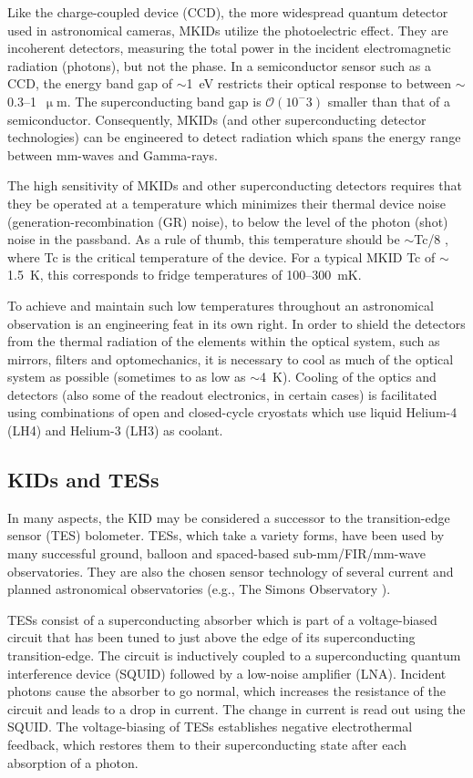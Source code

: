 Like the charge-coupled device (CCD), the more widespread quantum detector used in astronomical cameras, MKIDs utilize the photoelectric effect. They are incoherent detectors, measuring the total power in the incident electromagnetic radiation (photons), but not the phase. In a semiconductor sensor such as a CCD, the energy band gap of $\sim$1~eV restricts their optical response to between $\sim$0.3--1~$\upmu$m. The superconducting band gap is $\mathcal{O}(10^-3)$ smaller than that of a semiconductor. Consequently, MKIDs (and other superconducting detector technologies) can be engineered to detect radiation which spans the energy range between mm-waves and Gamma-rays.

The high sensitivity of MKIDs and other superconducting detectors requires that they be operated at a temperature which minimizes their thermal device noise (generation-recombination (GR) noise), to below the level of the photon (shot) noise in the passband. As a rule of thumb, this temperature should be $\sim$\gls{Tc}/8 \citep{mazin2013arcons}, where \gls{Tc} is the critical temperature of the device. For a typical MKID \gls{Tc} of $\sim$1.5~K, this corresponds to fridge temperatures of 100--300~mK.

To achieve and maintain such low temperatures throughout an astronomical observation is an engineering feat in its own right. In order to shield the detectors from the thermal radiation of the elements within the optical system, such as mirrors, filters and optomechanics, it is necessary to cool as much of the optical system as possible (sometimes to as low as $\sim$4~K). Cooling of the optics and detectors (also some of the readout electronics, in certain cases) is facilitated using combinations of open and closed-cycle cryostats which use liquid Helium-4 (LH4) and Helium-3 (LH3) as coolant.

\subsection{KIDs and TESs}

In many aspects, the KID may be considered a successor to the transition-edge sensor (TES) bolometer. TESs, which take a variety forms, have been used by many successful ground, balloon and spaced-based sub-mm/FIR/mm-wave observatories. They are also the chosen sensor technology of several current and planned astronomical observatories (e.g., The Simons Observatory \citep{ade2019simons}).

TESs consist of a superconducting absorber which is part of a voltage-biased circuit that has been tuned to just above the edge of its superconducting transition-edge. The circuit is inductively coupled to a superconducting quantum interference device (SQUID) followed by a low-noise amplifier (LNA). Incident photons cause the absorber to go normal, which increases the resistance of the circuit and leads to a drop in current. The change in current is read out using the SQUID. The voltage-biasing of TESs establishes negative electrothermal feedback, which restores them to their superconducting state after each absorption of a photon.


